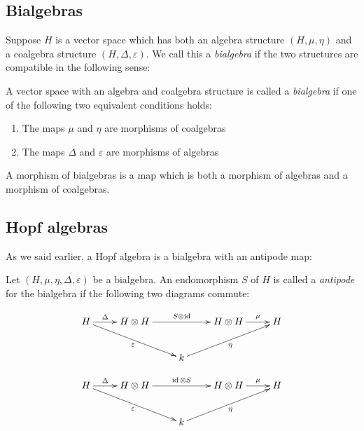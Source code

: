 \subsection{Bialgebras}

Suppose $H$ is a vector space which has both an algebra structure $(H, \mu,
\eta)$ and a coalgebra structure $(H, \Delta, \varepsilon)$. We call this a
\emph{bialgebra} if the two structures are compatible in the following sense:

\begin{defn}
    A vector space with an algebra and coalgebra structure is called a
    \emph{bialgebra} if one of the following two equivalent conditions holds:

    \begin{enumerate}
        \item The maps $\mu$ and $\eta$ are morphisms of coalgebras
        \item The maps $\Delta$ and $\varepsilon$ are morphisms of algebras
    \end{enumerate}
\end{defn}

A morphism of bialgebras is a map which is both a morphism of algebras and a
morphism of coalgebras.
\subsection{Hopf algebras}
As we said earlier, a Hopf algebra is a bialgebra with an antipode map:

\begin{defn}
    Let $(H, \mu, \eta, \Delta, \varepsilon)$ be a bialgebra. An endomorphism
    $S$ of $H$ is called a \emph{antipode} for the bialgebra if the following
    two diagrams commute:

    \begin{equation}
        \xymatrix{
        H \ar[r]^-{\Delta} \ar[rrd]_-{\varepsilon}& H \otimes H \ar[rr]^-{S \otimes \id} & & H \otimes H \ar[r]^-{\mu} & H \\
        & & k \ar[rru]_-{\eta}& &
        }
    \end{equation}

    \begin{equation}
        \xymatrix{
        H \ar[r]^-{\Delta} \ar[rrd]_-{\varepsilon}& H \otimes H \ar[rr]^-{\id \otimes S} & & H \otimes H \ar[r]^-{\mu} & H \\
        & & k \ar[rru]_-{\eta}& &
        }
    \end{equation}
\end{defn}

